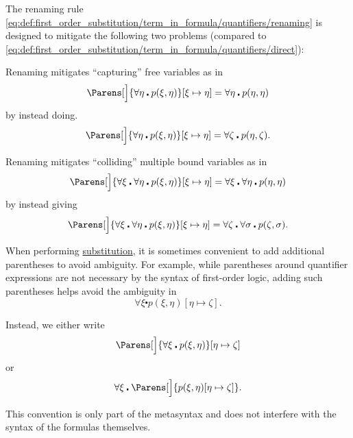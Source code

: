 \begin{remark}\label{rem:first_order_substitution_renaming_justification}
  The renaming rule \eqref{eq:def:first_order_substitution/term_in_formula/quantifiers/renaming} is designed to mitigate the following two problems (compared to \eqref{eq:def:first_order_substitution/term_in_formula/quantifiers/direct}):

  \begin{RemEnum}
     Renaming mitigates \enquote{capturing} free variables as in
    \begin{equation*}
      \Parens[\Big]{ \forall \eta \centerdot p(\xi, \eta) }[\xi \mapsto \eta] = \forall \eta \centerdot p(\eta, \eta)
    \end{equation*}
    by instead doing.
    \begin{equation*}
      \Parens[\Big]{ \forall \eta \centerdot p(\xi, \eta) }[\xi \mapsto \eta] = \forall \zeta \centerdot p(\eta, \zeta).
    \end{equation*}

     Renaming mitigates \enquote{colliding} multiple bound variables as in
    \begin{equation*}
      \Parens[\Big]{ \forall \xi \centerdot \forall \eta \centerdot p(\xi, \eta) }[\xi \mapsto \eta] = \forall \xi \centerdot \forall \eta \centerdot p(\eta, \eta)
    \end{equation*}
    by instead giving
    \begin{equation*}
      \Parens[\Big]{ \forall \xi \centerdot \forall \eta \centerdot p(\xi, \eta) }[\xi \mapsto \eta] = \forall \zeta \centerdot \forall \sigma \centerdot p(\zeta, \sigma).
    \end{equation*}
  \end{RemEnum}
\end{remark}

\begin{remark}\label{rem:first_order_substitution_parentheses}
  When performing \hyperref[def:propositional_substitution]{substitution}, it is sometimes convenient to add additional parentheses to avoid ambiguity. For example, while parentheses around quantifier expressions are not necessary by the syntax of first-order logic, adding such parentheses helps avoid the ambiguity in
  \begin{equation*}
    \forall \xi \centerdot p(\xi, \eta) [\eta \mapsto \zeta].
  \end{equation*}

  Instead, we either write
  \begin{equation*}
    \Parens[\Big]{ \forall \xi \centerdot p(\xi, \eta) } [\eta \mapsto \zeta]
  \end{equation*}
  or
  \begin{equation*}
    \forall \xi \centerdot \Parens[\Big]{ p(\xi, \eta)[\eta \mapsto \zeta] }.
  \end{equation*}

  This convention is only part of the metasyntax and does not interfere with the syntax of the formulas themselves.
\end{remark}

